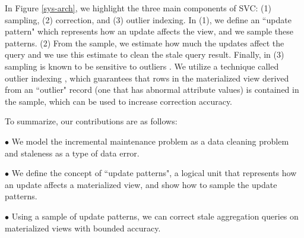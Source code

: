 

In Figure \ref{sys-arch}, we highlight the three main components of SVC: (1) sampling, (2) correction, and (3) outlier indexing. In (1), we define an ``update pattern" which represents how an update affects the view, and we sample these patterns. (2)  From the sample, we estimate how much the updates affect the query and we use this estimate to clean the stale query result.
Finally, in (3) sampling is known to be sensitive to outliers \cite{chaudhuri2001overcoming}.
We utilize a technique called outlier indexing \cite{chaudhuri2001overcoming}, which guarantees that rows in the materialized view derived from an ``outlier" record (one that has abnormal attribute values) is contained in the sample, which can be used to increase correction accuracy.

To summarize, our contributions are as follows:

\noindent $\bullet$ We model the incremental maintenance problem as a data cleaning problem and staleness as a type of data error.\vspace{0.2em}

\noindent $\bullet$ We define the concept of ``update patterns", a logical unit that represents how an update affects a materialized view, and show how to sample the update patterns. \vspace{0.2em}

\noindent $\bullet$ Using a sample of update patterns, we can correct stale aggregation queries on materialized views with bounded accuracy.\vspace{0.2em}

